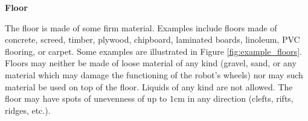 \textbf{Floor}

The floor is made of some firm material. Examples include floors made of concrete, screed, timber, plywood, chipboard, laminated boards, linoleum, PVC flooring, or carpet. Some examples are illustrated in Figure \ref{fig:example_floors}. Floors may neither be made of loose material of any kind (gravel, sand, or any material which may damage the functioning of the robot's wheels) nor may such material be used on top of the floor. Liquids of any kind are not allowed. The floor may have spots of unevenness of up to $1\si{\centi\meter}$ in any direction (clefts, rifts, ridges, etc.).


\begin{figure} [h!]
	\begin{center}
		 \hspace{0.1cm}
		 \hspace{0.1cm}
		 \hspace{0.1cm}
		 \hspace{0.1cm}
		\\

\end{center}
\end{figure}
